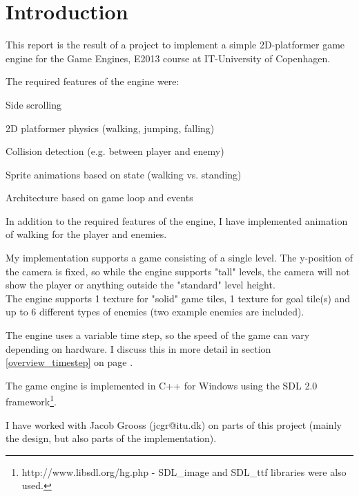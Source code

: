 \section{Introduction}
\label{Intro}
This report is the result of a project to implement a simple 2D-platformer game engine for the Game Engines, E2013 course at IT-University of Copenhagen.

The required features of the engine were:
\begin{my_itemize}
\item Side scrolling
\item 2D platformer physics (walking, jumping, falling)
\item Collision detection (e.g. between player and enemy)
\item Sprite animations based on state (walking vs. standing)
\item Architecture based on game loop and events
\end{my_itemize}

In addition to the required features of the engine, I have implemented animation of walking for the player and enemies.

My implementation supports a game consisting of a single level. The y-position of the camera is fixed, so while the engine supports "tall" levels, the camera will not show the player or anything outside the "standard" level height.
\\The engine supports 1 texture for "solid" game tiles, 1 texture for goal tile(s) and up to 6 different types of enemies (two example enemies are included).

The engine uses a variable time step, so the speed of the game can vary depending on hardware. I discuss this in more detail in section \ref{overview_timestep} on page \pageref{overview_timestep}.

The game engine is implemented in C++ for Windows using the SDL 2.0 framework\footnote{http://www.libsdl.org/hg.php - SDL\_image and SDL\_ttf libraries were also used.}.

I have worked with Jacob Grooss (jcgr@itu.dk) on parts of this project (mainly the design, but also parts of the implementation).
